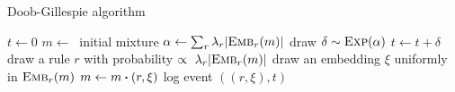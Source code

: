 \begin{algorithm}
\caption{Doob-Gillespie algorithm}\label{alg:gillespie}
\begin{spacing}{1.2}
\begin{algorithmic}
\vspace{0.2cm}
  \STATE $t \gets 0$
  \STATE $m \gets\ $ initial mixture
  \vspace{0.1cm}
      \vspace{0.1cm}
      \STATE $\alpha \gets \sum_r {\lambda_r |{\textsc{Emb}}_{r}(m)|}$
      \vspace{0.1cm}
      \STATE draw $\delta \sim \textsc{Exp}(\alpha) $
      \STATE $t \gets t + \delta$
      \STATE draw a rule $r$ with probability
      $\propto \ \lambda_r |{\textsc{Emb}}_{r}(m)|$
      \STATE draw an embedding $\xi$ uniformly in ${\textsc{Emb}}_{r}(m)$
      \STATE $m \gets \UPDATE{m}{(r, \xi)}$
      \STATE log event $((r, \xi), t)$
  \ENDWHILE
\vspace{0.1cm}
\end{algorithmic}
\end{spacing}
\end{algorithm}